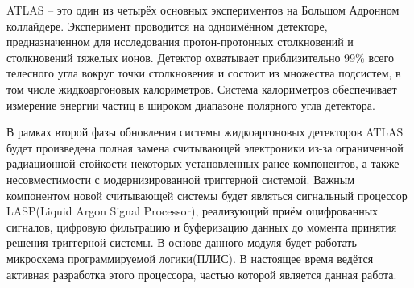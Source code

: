 ATLAS -- это один из четырёх основных экспериментов на Большом Адронном коллайдере. Эксперимент проводится на одноимённом детекторе, предназначенном для исследования протон-протонных столкновений и столкновений тяжелых ионов. Детектор охватывает приблизительно 99\% всего телесного угла вокруг точки столкновения и состоит из множества подсистем, в том числе жидкоаргоновых калориметров. Система калориметров обеспечивает измерение энергии частиц в широком диапазоне полярного угла детектора.\par
В рамках второй фазы обновления системы жидкоаргоновых детекторов ATLAS будет произведена полная замена считывающей электроники из-за ограниченной радиационной стойкости некоторых установленных ранее компонентов, а также несовместимости с модернизированной триггерной системой. Важным компонентом новой считывающей системы будет являться сигнальный процессор LASP(Liquid Argon Signal Processor), реализующий приём оцифрованных сигналов, цифровую фильтрацию и буферизацию данных до момента принятия решения триггерной системы. В основе данного модуля будет работать микросхема программируемой логики(ПЛИС). В настоящее время ведётся активная разработка этого процессора, частью которой является данная работа.\par
